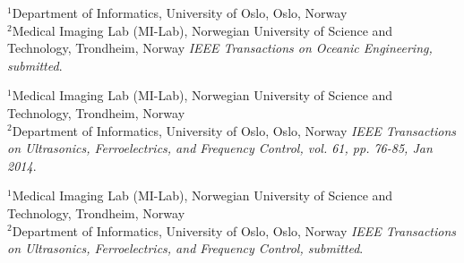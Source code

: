 \documentclass[10pt,b5paper,twoside]{book}
\begin{document}



\setcounter{chapter}{0}

\begin{bibunit}[ieeetr]
{
	$^{1}$Department of Informatics, University of Oslo, Oslo, Norway\\
    	$^{2}$Medical Imaging Lab (MI-Lab), Norwegian University of Science and Technology, Trondheim, Norway
}
\noindent \textit{IEEE Transactions on Oceanic Engineering, submitted}.
\end{bibunit}


\begin{bibunit}[ieeetr]
{
	$^{1}$Medical Imaging Lab (MI-Lab), Norwegian University of Science and Technology, Trondheim, Norway\\
    	$^{2}$Department of Informatics, University of Oslo, Oslo, Norway
}
\noindent \textit{IEEE Transactions on Ultrasonics, Ferroelectrics, and Frequency Control, vol. 61, pp. 76-85, Jan 2014}.
%
\end{bibunit}


\begin{bibunit}[ieeetr]
{
	$^{1}$Medical Imaging Lab (MI-Lab), Norwegian University of Science and Technology, Trondheim, Norway\\
    	$^{2}$Department of Informatics, University of Oslo, Oslo, Norway
}
\noindent \textit{IEEE Transactions on Ultrasonics, Ferroelectrics, and Frequency Control, submitted}.
%
\end{bibunit}
\end{document}
